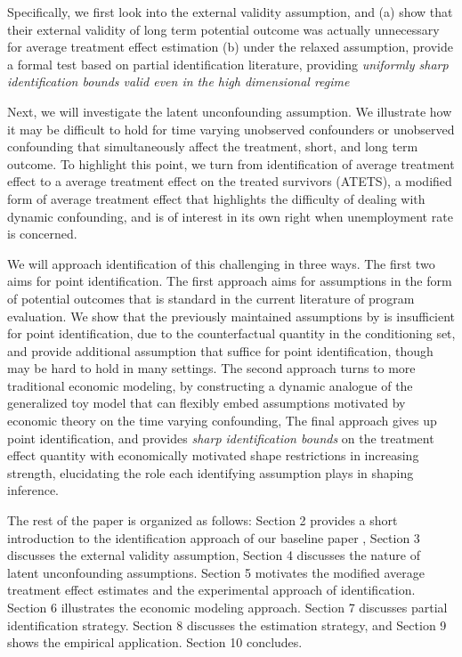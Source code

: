 \documentclass{article}
\begin{document}
Specifically, we first look into the external validity assumption, and (a) show that their external validity of long term potential outcome was actually unnecessary for average treatment effect estimation (b) under the relaxed assumption, provide a formal test based on partial identification literature, providing \textit{uniformly sharp identification bounds valid even in the high dimensional regime}

Next, we will investigate the latent unconfounding assumption. We illustrate how it may be difficult to hold for time varying unobserved confounders or unobserved confounding that simultaneously affect the treatment, short, and long term outcome. To highlight this point, we turn from identification of average treatment effect to a average treatment effect on the treated survivors (ATETS), a modified form of average treatment effect that highlights the difficulty of dealing with dynamic confounding, and is of interest in its own right when unemployment rate is concerned. 

We will approach identification of this challenging in three ways. The first two aims for point identification. The first approach aims for assumptions in the form of potential outcomes that is standard in the current literature of program evaluation. We show that the previously maintained assumptions by \cite{athey2020combining}is insufficient for point identification, due to the counterfactual quantity in the conditioning set, and provide additional assumption that suffice for point identification, though may be hard to hold in many settings. The second approach turns to more traditional economic modeling, by constructing a dynamic analogue of the generalized toy model\cite{heckman2007dynamic} \cite{roy1951some}that can flexibly embed assumptions motivated by economic theory on the time varying confounding, The final approach gives up point identification, and provides \textit{sharp identification bounds }on the treatment effect quantity with economically motivated shape restrictions in increasing strength, elucidating the role each identifying assumption plays in shaping inference.

The rest of the paper is organized as follows: Section 2 provides a short introduction to the identification approach of our baseline paper \cite{athey2020combining}, Section 3 discusses the external validity assumption, Section 4 discusses the nature of latent unconfounding assumptions. Section 5 motivates the modified average treatment effect estimates and the experimental approach of identification. Section 6 illustrates the economic modeling approach. Section 7 discusses partial identification strategy. Section 8 discusses the estimation strategy, and Section 9 shows the empirical application. Section 10 concludes.
\end{document}
